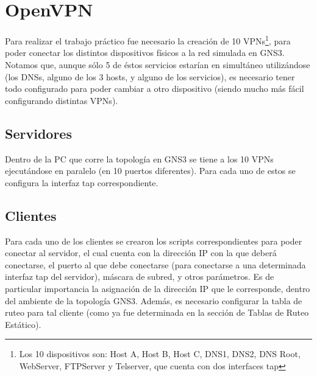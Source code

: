 \section{OpenVPN}
Para realizar el trabajo práctico fue necesario la creación de 10 VPNs\footnote{Los 10 dispositivos son: Host A, Host B, Host C, DNS1, DNS2, DNS Root, WebServer, FTPServer y Telserver, que cuenta con dos interfaces tap}, para poder conectar los distintos dispositivos físicos a la red simulada en GNS3. Notamos que, aunque sólo 5 de éstos servicios estarían en simultáneo utilizándose (los DNSs, alguno de los 3 hosts, y alguno de los servicios), es necesario tener todo configurado para poder cambiar a otro dispositivo (siendo mucho más fácil configurando distintas VPNs).

\subsection{Servidores}
Dentro de la PC que corre la topología en GNS3 se tiene a los 10 VPNs ejecutándose en paralelo (en 10 puertos diferentes). Para cada uno de estos se configura la interfaz tap correspondiente. 

\subsection{Clientes}
Para cada uno de los clientes se crearon los scripts correspondientes para poder conectar al servidor, el cual cuenta con la dirección IP con la que deberá conectarse, el puerto al que debe conectarse (para conectarse a una determinada interfaz tap del servidor), máscara de subred, y otros parámetros. Es de particular importancia la asignación de la dirección IP que le corresponde, dentro del ambiente de la topología GNS3. Además, es necesario configurar la tabla de ruteo para tal cliente (como ya fue determinada en la sección de Tablas de Ruteo Estático).
